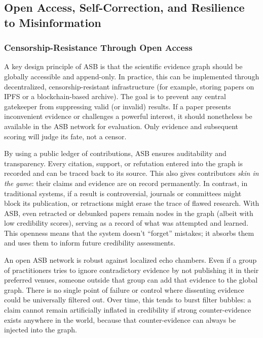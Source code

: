 \documentclass{article}
\begin{document}
\subsection{Open Access, Self-Correction, and Resilience to Misinformation}


\subsubsection{Censorship-Resistance Through Open Access}
A key design principle of ASB is that the scientific evidence graph should be globally accessible and append-only. In practice, this can be implemented through decentralized, censorship-resistant infrastructure (for example, storing papers on IPFS or a blockchain-based archive). The goal is to prevent any central gatekeeper from suppressing valid (or invalid) results. If a paper presents inconvenient evidence or challenges a powerful interest, it should nonetheless be available in the ASB network for evaluation. Only evidence and subsequent scoring will judge its fate, not a censor.

By using a public ledger of contributions, ASB ensures auditability and transparency. Every citation, support, or refutation entered into the graph is recorded and can be traced back to its source. This also gives contributors \emph{skin in the game}: their claims and evidence are on record permanently. In contrast, in traditional systems, if a result is controversial, journals or committees might block its publication, or retractions might erase the trace of flawed research. With ASB, even retracted or debunked papers remain nodes in the graph (albeit with low credibility scores), serving as a record of what was attempted and learned. This openness means that the system doesn't ``forget'' mistakes; it absorbs them and uses them to inform future credibility assessments.

An open ASB network is robust against localized echo chambers. Even if a group of practitioners tries to ignore contradictory evidence by not publishing it in their preferred venues, someone outside that group can add that evidence to the global graph. There is no single point of failure or control where dissenting evidence could be universally filtered out. Over time, this tends to burst filter bubbles: a claim cannot remain artificially inflated in credibility if strong counter-evidence exists anywhere in the world, because that counter-evidence can always be injected into the graph.
\end{document}
